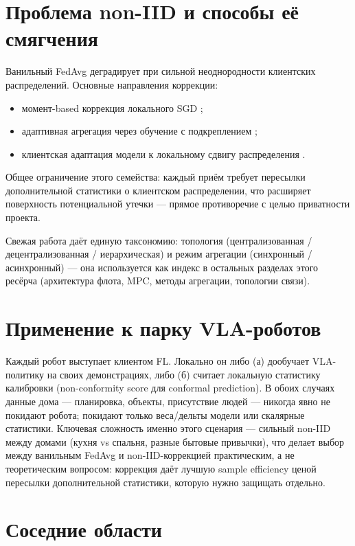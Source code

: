 \documentclass[11pt]{article}
\begin{document}
\section{Проблема non-IID и способы её смягчения}

Ванильный FedAvg деградирует при сильной неоднородности клиентских распределений.
Основные направления коррекции:
\begin{itemize}
  \item момент-based коррекция локального SGD \cite{momentum2023};
  \item адаптивная агрегация через обучение с подкреплением \cite{feddrl2022};
  \item клиентская адаптация модели к локальному сдвигу распределения
        \cite{clientadapt2020}.
\end{itemize}
Общее ограничение этого семейства: каждый приём требует пересылки дополнительной
статистики о клиентском распределении, что расширяет поверхность потенциальной
утечки — прямое противоречие с целью приватности проекта.

Свежая работа \cite{fltaxonomy2025} даёт единую таксономию: топология
(централизованная / децентрализованная / иерархическая) и режим агрегации
(синхронный / асинхронный) — она используется как индекс в остальных разделах этого
ресёрча (архитектура флота, MPC, методы агрегации, топологии связи).

\section{Применение к парку VLA-роботов}

Каждый робот выступает клиентом FL. Локально он либо (а) дообучает VLA-политику на
своих демонстрациях, либо (б) считает локальную статистику калибровки
(non-conformity score для conformal prediction). В обоих случаях данные дома —
планировка, объекты, присутствие людей — никогда явно не покидают робота; покидают
только веса/дельты модели или скалярные статистики. Ключевая сложность именно этого
сценария — сильный non-IID между домами (кухня vs спальня, разные бытовые привычки),
что делает выбор между ванильным FedAvg и non-IID-коррекцией практическим, а не
теоретическим вопросом: коррекция даёт лучшую sample efficiency ценой пересылки
дополнительной статистики, которую нужно защищать отдельно.

\section{Соседние области}
\end{document}
